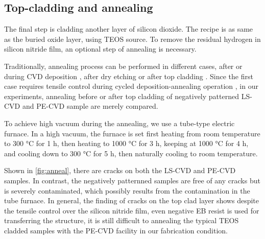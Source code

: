 \subsection{Top-cladding and annealing}
The final step is cladding another layer of silicon dioxide. The recipe is as same as the buried oxide layer, using TEOS source. 
To remove the residual hydrogen in silicon nitride film, an optional step of annealing is necessary. 

Traditionally, annealing process can be performed in different cases, after or during CVD deposition \cite{Luke2013}, after dry etching or after top cladding \cite{Ang2018}. Since the first case requires tensile control during cycled deposition-annealing operation \cite{Luke2013}, in our experiments, annealing before or after top cladding of negatively patterned LS-CVD and PE-CVD sample are merely compared.

To achieve high vacuum during the annealing, we use a tube-type electric furnace. In a high vacuum, the furnace is set first heating from room temperature to 300 \si{\celsius} for 1 h, then heating to 1000 \si{\celsius} for 3 h, keeping at 1000 \si{\celsius} for 4 h, and cooling down to 300 \si{\celsius} for 5 h, then naturally cooling to room temperature. 

Shown in \autoref{fig:anneal}, there are cracks on both the LS-CVD and PE-CVD samples. In contrast, the negatively patternned samples are free of any cracks but is severely contaminated, which possibly results from the contamination in the tube furnace. 
In general, the finding of cracks on the top clad layer shows despite the tensile control over the silicon nitride film, even negative EB resist is used for transferring the structure, it is still difficult to annealing the typical TEOS cladded samples with the PE-CVD facility in our fabrication condition.

